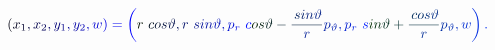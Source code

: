 \documentclass[12pt]{article}
\begin{document}
\makeatletter
\renewcommand*{\@textcolor}[3]{%
  \protect\leavevmode
  \begingroup
    \color#1{#2}#3%
  \endgroup
}
\makeatother
\begin{displaymath}
\mathcolor[RGB]{0,0,15}{(} \mathcolor[RGB]{0,0,30}{x} _ { \mathcolor[RGB]{0,0,45}{1} } \mathcolor[RGB]{0,0,60}{,} \mathcolor[RGB]{0,0,75}{x} _ { \mathcolor[RGB]{0,0,90}{2} } \mathcolor[RGB]{0,0,105}{,} \mathcolor[RGB]{0,0,120}{y} _ { \mathcolor[RGB]{0,0,135}{1} } \mathcolor[RGB]{0,0,150}{,} \mathcolor[RGB]{0,0,165}{y} _ { \mathcolor[RGB]{0,0,180}{2} } \mathcolor[RGB]{0,0,195}{,} \mathcolor[RGB]{0,0,210}{w} \mathcolor[RGB]{0,0,225}{)} \mathcolor[RGB]{0,0,240}{=} \mathcolor[RGB]{0,0,255}{\left(} \mathcolor[RGB]{0,15,0}{r} \mathcolor[RGB]{0,15,15}{\operatorname*} { \mathcolor[RGB]{0,15,30}{c} \mathcolor[RGB]{0,15,45}{o} \mathcolor[RGB]{0,15,60}{s} } \mathcolor[RGB]{0,15,75}{\vartheta} \mathcolor[RGB]{0,15,90}{,} \mathcolor[RGB]{0,15,105}{r} \mathcolor[RGB]{0,15,120}{\operatorname*} { \mathcolor[RGB]{0,15,135}{s} \mathcolor[RGB]{0,15,150}{i} \mathcolor[RGB]{0,15,165}{n} } \mathcolor[RGB]{0,15,180}{\vartheta} \mathcolor[RGB]{0,15,195}{,} \mathcolor[RGB]{0,15,210}{p} _ { \mathcolor[RGB]{0,15,225}{r} } \mathcolor[RGB]{0,15,240}{\operatorname*} { \mathcolor[RGB]{0,15,255}{c} \mathcolor[RGB]{0,30,0}{o} \mathcolor[RGB]{0,30,15}{s} } \mathcolor[RGB]{0,30,30}{\vartheta} \mathcolor[RGB]{0,30,45}{-} \mathcolor[RGB]{0,30,60}{\frac { \mathcolor[RGB]{0,30,75}{\operatorname*} { \mathcolor[RGB]{0,30,90}{s} \mathcolor[RGB]{0,30,105}{i} \mathcolor[RGB]{0,30,120}{n} } \mathcolor[RGB]{0,30,135}{\vartheta} } { \mathcolor[RGB]{0,30,150}{r} } } \mathcolor[RGB]{0,30,165}{p} _ { \mathcolor[RGB]{0,30,180}{\vartheta} } \mathcolor[RGB]{0,30,195}{,} \mathcolor[RGB]{0,30,210}{p} _ { \mathcolor[RGB]{0,30,225}{r} } \mathcolor[RGB]{0,30,240}{\operatorname*} { \mathcolor[RGB]{0,30,255}{s} \mathcolor[RGB]{0,45,0}{i} \mathcolor[RGB]{0,45,15}{n} } \mathcolor[RGB]{0,45,30}{\vartheta} \mathcolor[RGB]{0,45,45}{+} \mathcolor[RGB]{0,45,60}{\frac { \mathcolor[RGB]{0,45,75}{\operatorname*} { \mathcolor[RGB]{0,45,90}{c} \mathcolor[RGB]{0,45,105}{o} \mathcolor[RGB]{0,45,120}{s} } \mathcolor[RGB]{0,45,135}{\vartheta} } { \mathcolor[RGB]{0,45,150}{r} } } \mathcolor[RGB]{0,45,165}{p} _ { \mathcolor[RGB]{0,45,180}{\vartheta} } \mathcolor[RGB]{0,45,195}{,} \mathcolor[RGB]{0,45,210}{w} \mathcolor[RGB]{0,45,225}{\right)} \mathcolor[RGB]{0,45,240}{.}
\end{displaymath}
\end{document}
